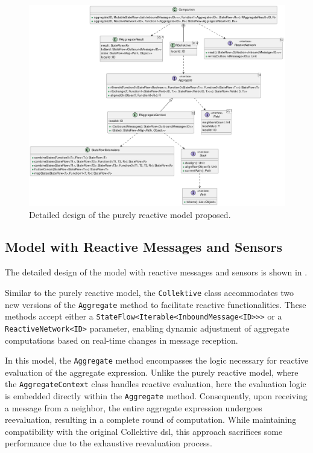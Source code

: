 \begin{figure}
    \centering
    \includegraphics[width=\linewidth]{figures/collektive-prm-design.pdf}
    \caption{Detailed design of the purely reactive model proposed.}
    \label{fig:collektive-prm-design}
\end{figure}

\subsection{Model with Reactive Messages and Sensors}
The detailed design of the model with reactive messages and sensors is shown in .

Similar to the purely reactive model, the \texttt{Collektive} class accommodates two new versions of the \texttt{Aggregate} method to facilitate reactive functionalities. These methods accept either a \texttt{StateFlow<Iterable<InboundMessage<ID>>>} or a \texttt{ReactiveNetwork<ID>} parameter, enabling dynamic adjustment of aggregate computations based on real-time changes in message reception.

In this model, the \texttt{Aggregate} method encompasses the logic necessary for reactive evaluation of the aggregate expression. Unlike the purely reactive model, where the \texttt{AggregateContext} class handles reactive evaluation, here the evaluation logic is embedded directly within the \texttt{Aggregate} method. Consequently, upon receiving a message from a neighbor, the entire aggregate expression undergoes reevaluation, resulting in a complete round of computation. While maintaining compatibility with the original Collektive \ac{dsl}, this approach sacrifices some performance due to the exhaustive reevaluation process.

